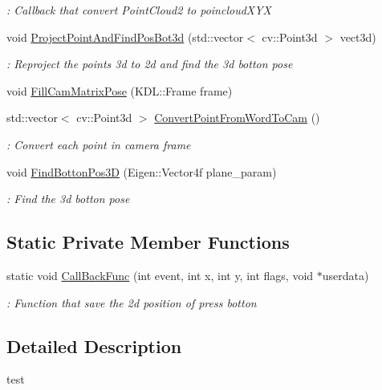 \begin{DoxyCompactItemize}
\begin{DoxyCompactList}\small\item\em \-: Callback that convert Point\-Cloud2 to poincloud\-X\-Y\-X \end{DoxyCompactList}\item 
void \hyperlink{classCamera_ae525d3deac4c9b70b8ea8eecec745a3b}{Project\-Point\-And\-Find\-Pos\-Bot3d} (std\-::vector$<$ cv\-::\-Point3d $>$ vect3d)
\begin{DoxyCompactList}\small\item\em \-: Reproject the points 3d to 2d and find the 3d botton pose \end{DoxyCompactList}\item 
void \hyperlink{classCamera_ae5bb06fd55207b065e33bde4039153cc}{Fill\-Cam\-Matrix\-Pose} (K\-D\-L\-::\-Frame frame)
\item 
std\-::vector$<$ cv\-::\-Point3d $>$ \hyperlink{classCamera_ac9384b90060c9c89ff27479921fab6ee}{Convert\-Point\-From\-Word\-To\-Cam} ()
\begin{DoxyCompactList}\small\item\em \-: Convert each point in camera frame \end{DoxyCompactList}\item 
void \hyperlink{classCamera_a37ef35f0b078fbe103281500864e522a}{Find\-Botton\-Pos3\-D} (Eigen\-::\-Vector4f plane\-\_\-param)
\begin{DoxyCompactList}\small\item\em \-: Find the 3d botton pose \end{DoxyCompactList}\end{DoxyCompactItemize}
\subsection*{Static Private Member Functions}
\begin{DoxyCompactItemize}
\item 
static void \hyperlink{classCamera_aec7ddfff22b1a200c7fc2ea36eb6512d}{Call\-Back\-Func} (int event, int x, int y, int flags, void $\ast$userdata)
\begin{DoxyCompactList}\small\item\em \-: Function that save the 2d position of press botton \end{DoxyCompactList}\end{DoxyCompactItemize}


\subsection{Detailed Description}
test 

